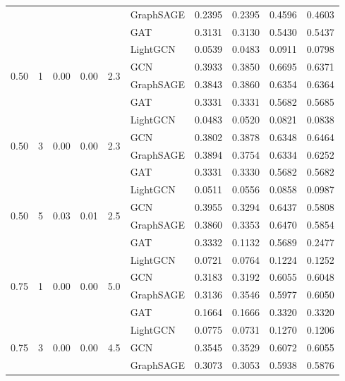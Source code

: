 {\begin{longtable}{cccccl rrrr}
 & & & & & GraphSAGE & 0.2395 & 0.2395 & 0.4596 & 0.4603 \\
 & & & & & GAT & 0.3131 & 0.3130 & 0.5430 & 0.5437 \\
\midrule
\multirow{4}{*}{0.50} & \multirow{4}{*}{1} & \multirow{4}{*}{0.00} & \multirow{4}{*}{0.00} & \multirow{4}{*}{2.3} & LightGCN & 0.0539 & 0.0483 & 0.0911 & 0.0798 \\
 & & & & & GCN & 0.3933 & 0.3850 & 0.6695 & 0.6371 \\
 & & & & & GraphSAGE & 0.3843 & 0.3860 & 0.6354 & 0.6364 \\
 & & & & & GAT & 0.3331 & 0.3331 & 0.5682 & 0.5685 \\
\midrule
\multirow{4}{*}{0.50} & \multirow{4}{*}{3} & \multirow{4}{*}{0.00} & \multirow{4}{*}{0.00} & \multirow{4}{*}{2.3} & LightGCN & 0.0483 & 0.0520 & 0.0821 & 0.0838 \\
 & & & & & GCN & 0.3802 & 0.3878 & 0.6348 & 0.6464 \\
 & & & & & GraphSAGE & 0.3894 & 0.3754 & 0.6334 & 0.6252 \\
 & & & & & GAT & 0.3331 & 0.3330 & 0.5682 & 0.5682 \\
\midrule
\multirow{4}{*}{0.50} & \multirow{4}{*}{5} & \multirow{4}{*}{0.03} & \multirow{4}{*}{0.01} & \multirow{4}{*}{2.5} & LightGCN & 0.0511 & 0.0556 & 0.0858 & 0.0987 \\
 & & & & & GCN & 0.3955 & 0.3294 & 0.6437 & 0.5808 \\
 & & & & & GraphSAGE & 0.3860 & 0.3353 & 0.6470 & 0.5854 \\
 & & & & & GAT & 0.3332 & 0.1132 & 0.5689 & 0.2477 \\
\midrule
\multirow{4}{*}{0.75} & \multirow{4}{*}{1} & \multirow{4}{*}{0.00} & \multirow{4}{*}{0.00} & \multirow{4}{*}{5.0} & LightGCN & 0.0721 & 0.0764 & 0.1224 & 0.1252 \\
 & & & & & GCN & 0.3183 & 0.3192 & 0.6055 & 0.6048 \\
 & & & & & GraphSAGE & 0.3136 & 0.3546 & 0.5977 & 0.6050 \\
 & & & & & GAT & 0.1664 & 0.1666 & 0.3320 & 0.3320 \\
\midrule
\multirow{4}{*}{0.75} & \multirow{4}{*}{3} & \multirow{4}{*}{0.00} & \multirow{4}{*}{0.00} & \multirow{4}{*}{4.5} & LightGCN & 0.0775 & 0.0731 & 0.1270 & 0.1206 \\
 & & & & & GCN & 0.3545 & 0.3529 & 0.6072 & 0.6055 \\
 & & & & & GraphSAGE & 0.3073 & 0.3053 & 0.5938 & 0.5876 \\

\end{longtable}}
